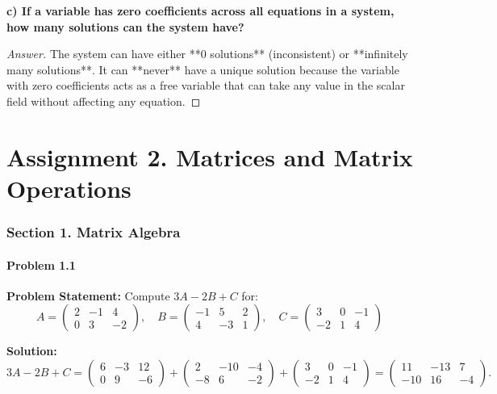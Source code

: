 \documentclass[11pt, a4paper]{article}
\begin{document}
\textbf{c) If a variable has zero coefficients across all equations in a system, how many solutions can the system have?}
\begin{proof}[Answer]
The system can have either **0 solutions** (inconsistent) or **infinitely many solutions**. It can **never** have a unique solution because the variable with zero coefficients acts as a free variable that can take any value in the scalar field without affecting any equation.
\end{proof}

\newpage

\part{Assignment 2. Matrices and Matrix Operations}

\section{Section 1. Matrix Algebra}

\subsection*{Problem 1.1}
\textbf{Problem Statement:} Compute $3A - 2B + C$ for:
$$ A = \begin{pmatrix} 2 & -1 & 4 \\ 0 & 3 & -2 \end{pmatrix}, \quad B = \begin{pmatrix} -1 & 5 & 2 \\ 4 & -3 & 1 \end{pmatrix}, \quad C = \begin{pmatrix} 3 & 0 & -1 \\ -2 & 1 & 4 \end{pmatrix} $$

\textbf{Solution:}
$$ 3A - 2B + C = \begin{pmatrix} 6 & -3 & 12 \\ 0 & 9 & -6 \end{pmatrix} + \begin{pmatrix} 2 & -10 & -4 \\ -8 & 6 & -2 \end{pmatrix} + \begin{pmatrix} 3 & 0 & -1 \\ -2 & 1 & 4 \end{pmatrix} = \begin{pmatrix} 11 & -13 & 7 \\ -10 & 16 & -4 \end{pmatrix}. $$
\end{document}
